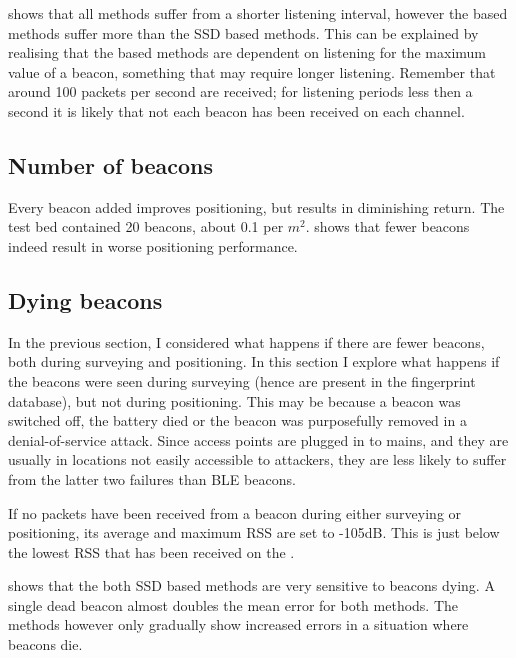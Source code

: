  shows that all methods suffer from a shorter listening interval, however the \aBRP based methods suffer more than the SSD based methods.
This can be explained by realising that the \aBRP based methods are dependent on listening for the maximum value of a beacon, something that may require longer listening.
Remember that around 100 packets per second are received; for listening periods less then a second it is likely that not each beacon has been received on each channel.

\subsection{Number of beacons}
Every beacon added improves positioning, but results in diminishing return.
The test bed contained 20 beacons, about 0.1 per $m^2$.
 shows that fewer beacons indeed result in worse positioning performance.


\subsection{Dying beacons}
\label{sec:architecture-dying-beacons}
In the previous section, I considered what happens if there are fewer beacons, both during surveying and positioning.
In this section I explore what happens if the beacons were seen during surveying (hence are present in the fingerprint database), but not during positioning.
This may be because a beacon was switched off, the battery died or the beacon was purposefully removed in a denial-of-service attack.
Since \wifi access points are plugged in to mains, and they are usually in locations not easily accessible to attackers, they are less likely to suffer from the latter two failures than BLE beacons.

If no packets have been received from a beacon during either surveying or positioning, its average and maximum RSS are set to -105dB.
This is just below the lowest RSS that has been received on the \device.

 shows that the both SSD based methods are very sensitive to beacons dying.
A single dead beacon almost doubles the mean error for both methods.
The \aBRP methods however only gradually show increased errors in a situation where beacons die.

